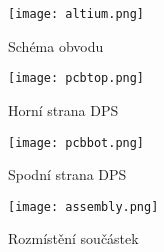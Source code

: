 \begin{figure}[h]
\centering
\texttt{[image: altium.png]}
\caption[]{Schéma obvodu}
\end{figure}
\begin{figure}[h]
\centering
\texttt{[image: pcbtop.png]}
\caption[]{Horní strana DPS}
\end{figure}
\begin{figure}[h]
\centering
\texttt{[image: pcbbot.png]}
\caption[]{Spodní strana DPS}
\end{figure}
\begin{figure}[h]
\centering
\texttt{[image: assembly.png]}
\caption[]{Rozmístění součástek}
\end{figure}